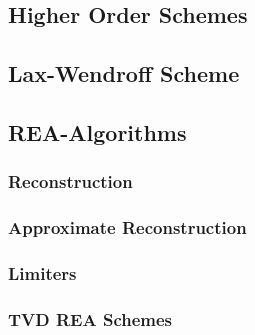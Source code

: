 \documentclass[
  fourColumns,
  landscape
]{formularyETH/formularyETH}
\begin{document}
  \subsection*{Higher Order Schemes}\label{subsec:higher_order_schemes}
    
  \subsection{Lax-Wendroff Scheme\hfill{}}\label{subsubsec:lax-wendroff_scheme}
      
    \subsection{REA-Algorithms}\label{subsec:rea}
      \subsubsection{Reconstruction}\label{subsec:reconstruction}
        
      \subsubsection{Approximate Reconstruction}\label{subsubsec:approximate_reconstruction}
        
        \label{subsubsubsec:constraints}
        
    \subsubsection{Limiters}\label{subsubsec:limiters}
        
        \label{subsubsubsec:minmod_limiter}
          
        \label{subsubsubsec:superbee_limiter}
          
        \label{subsubsubsec:mc_limiter}
          
    \subsubsection{TVD REA Schemes}\label{subsubsec:name}
      
\end{document}
